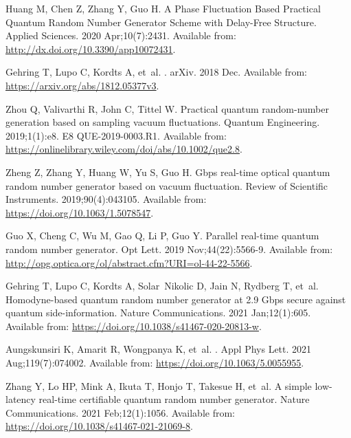 \documentclass[]{interact}
\theoremstyle{plain}%
\theoremstyle{definition}
\theoremstyle{remark}
\begin{document}
\begin{thebibliography}{100}
Huang M, Chen Z, Zhang Y, Guo H.
\newblock A Phase Fluctuation Based Practical Quantum Random Number Generator
  Scheme with Delay-Free Structure.
\newblock Applied Sciences. 2020 Apr;10(7):2431.
\newblock Available from: \url{http://dx.doi.org/10.3390/app10072431}.

Gehring T, Lupo C, Kordts A, et~al.
.
\newblock arXiv. 2018 Dec.
\newblock Available from: \url{https://arxiv.org/abs/1812.05377v3}.

Zhou Q, Valivarthi R, John C, Tittel W.
\newblock Practical quantum random-number generation based on sampling vacuum
  fluctuations.
\newblock Quantum Engineering. 2019;1(1):e8.
\newblock E8 QUE-2019-0003.R1.
\newblock Available from:
  \url{https://onlinelibrary.wiley.com/doi/abs/10.1002/que2.8}.

Zheng Z, Zhang Y, Huang W, Yu S, Guo H.
 Gbps real-time optical quantum random number generator based on
  vacuum fluctuation.
\newblock Review of Scientific Instruments. 2019;90(4):043105.
\newblock Available from: \url{https://doi.org/10.1063/1.5078547}.

Guo X, Cheng C, Wu M, Gao Q, Li P, Guo Y.
\newblock Parallel real-time quantum random number generator.
\newblock Opt Lett. 2019 Nov;44(22):5566-9.
\newblock Available from:
  \url{http://opg.optica.org/ol/abstract.cfm?URI=ol-44-22-5566}.

Gehring T, Lupo C, Kordts A, Solar~Nikolic D, Jain N, Rydberg T, et~al.
\newblock Homodyne-based quantum random number generator at 2.9 Gbps secure
  against quantum side-information.
\newblock Nature Communications. 2021 Jan;12(1):605.
\newblock Available from: \url{https://doi.org/10.1038/s41467-020-20813-w}.

Aungskunsiri K, Amarit R, Wongpanya K, et~al.
.
\newblock Appl Phys Lett. 2021 Aug;119(7):074002.
\newblock Available from: \url{https://doi.org/10.1063/5.0055955}.

Zhang Y, Lo HP, Mink A, Ikuta T, Honjo T, Takesue H, et~al.
\newblock A simple low-latency real-time certifiable quantum random number
  generator.
\newblock Nature Communications. 2021 Feb;12(1):1056.
\newblock Available from: \url{https://doi.org/10.1038/s41467-021-21069-8}.


\end{thebibliography}
\end{document}

